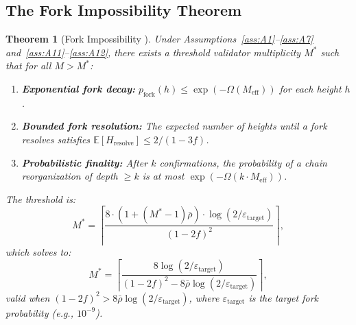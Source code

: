 \documentclass[11pt,a4paper]{article}
\newtheorem{theorem}{Theorem}[section]
\theoremstyle{definition}
\newcommand{\E}{\mathbb{E}}
\newcommand{\mthreshold}{M^{*}}
\begin{document}
\subsection{The Fork Impossibility Theorem}
\begin{theorem}[Fork Impossibility ]
\label{thm:fork}
Under Assumptions~\ref{ass:A1}--\ref{ass:A7} and~\ref{ass:A11}--\ref{ass:A12}, there exists a threshold validator multiplicity $\mthreshold$ such that for all $M > \mthreshold$:
\begin{enumerate}[label=(\roman*)]
    \item \textbf{Exponential fork decay:} $p_{\mathrm{fork}}(h) \leq \exp(-\Omega(M_{\mathrm{eff}}))$ for each height $h$.
    \item \textbf{Bounded fork resolution:} The expected number of heights until a fork resolves satisfies $\E[H_{\mathrm{resolve}}] \leq 2 / (1 - 3f)$.
    \item \textbf{Probabilistic finality:} After $k$ confirmations, the probability of a chain reorganization of depth $\geq k$ is at most $\exp(-\Omega(k \cdot M_{\mathrm{eff}}))$.
\end{enumerate}
The threshold is:
\begin{equation}
    \mthreshold = \left\lceil \frac{8 \cdot (1 + (\mthreshold - 1)\bar{\rho}) \cdot \log(2 / \varepsilon_{\mathrm{target}})}{(1 - 2f)^2} \right\rceil,
    \label{eq:M_star_fork}
\end{equation}
which solves to:
\begin{equation}
    \mthreshold = \left\lceil \frac{8 \log(2 / \varepsilon_{\mathrm{target}})}{(1 - 2f)^2 - 8 \bar{\rho} \log(2 / \varepsilon_{\mathrm{target}})} \right\rceil,
    \label{eq:M_star_fork_explicit}
\end{equation}
valid when $(1 - 2f)^2 > 8 \bar{\rho} \log(2 / \varepsilon_{\mathrm{target}})$, where $\varepsilon_{\mathrm{target}}$ is the target fork probability (e.g., $10^{-9}$).
\end{theorem}
\end{document}
